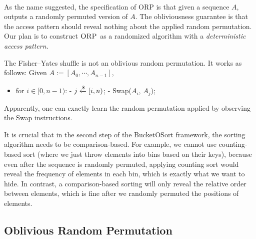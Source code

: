 $ $

As the name suggested, the specification of \textsc{ORP} is that given a sequence $A$, outputs a randomly permuted version of $A$. The obliviousness guarantee is that the access pattern should reveal nothing about the applied random permutation. Our plan is to construct $\textsc{ORP}$ as a randomized algorithm with a \emph{deterministic access pattern}.

\begin{nonexample}
    The Fisher–Yates shuffle is not an oblivious random permutation. It works as follows: Given $A := [A_0, \cdots, A_{n-1}]$,
    \begin{itemize}
        \item for $i \in [0, n-1)$:
        \subitem - $j \xleftarrow{\$}  [i, n)$;
        \subitem - Swap($A_i$, $A_j$);
    \end{itemize}
    Apparently, one can exactly learn the random permutation applied by observing the Swap instructions. 
\end{nonexample}

\begin{remark}
    It is crucial that in the second step of the BucketOSort framework, the sorting algorithm needs to be comparison-based. For example, we cannot use counting-based sort (where we just throw elements
into bins based on their keys),  
because even after the sequence is randomly permuted, applying counting sort would reveal the frequency of elements in each bin, which is exactly what we want to hide. In contrast, a comparison-based sorting will only reveal the relative order between elements, which is fine after we randomly permuted the positions of elements.
\end{remark}

\subsection{Oblivious Random Permutation}

